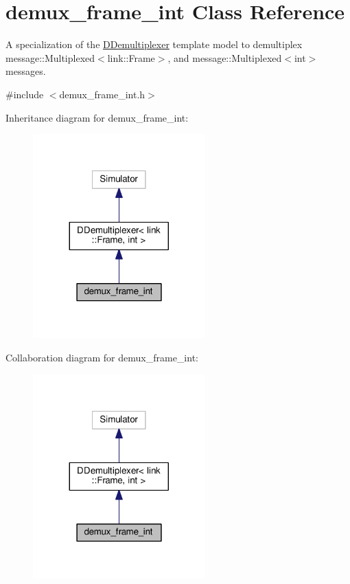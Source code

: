 \hypertarget{classdemux__frame__int}{}\section{demux\+\_\+frame\+\_\+int Class Reference}
\label{classdemux__frame__int}


A specialization of the \hyperlink{classDDemultiplexer}{D\+Demultiplexer} template model to demultiplex message\+::\+Multiplexed$<$link\+::\+Frame$>$, and message\+::\+Multiplexed$<$int$>$ messages.  




{\ttfamily \#include $<$demux\+\_\+frame\+\_\+int.\+h$>$}



Inheritance diagram for demux\+\_\+frame\+\_\+int\+:\nopagebreak
\begin{figure}[H]
\begin{center}
\leavevmode
\includegraphics[width=188pt]{classdemux__frame__int__inherit__graph}
\end{center}
\end{figure}


Collaboration diagram for demux\+\_\+frame\+\_\+int\+:\nopagebreak
\begin{figure}[H]
\begin{center}
\leavevmode
\includegraphics[width=188pt]{classdemux__frame__int__coll__graph}
\end{center}
\end{figure}
